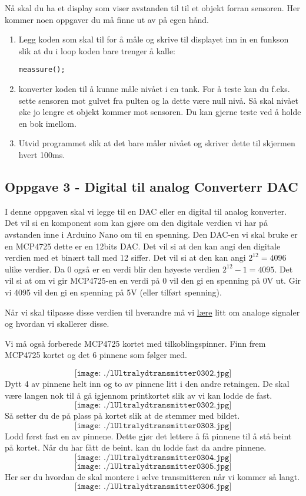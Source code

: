 \vskip 5pt 
Nå skal du ha et display som viser avstanden til til et objekt forran sensoren. Her kommer noen oppgaver du må finne ut av på egen hånd.
\begin{enumerate}
	\item Legg koden som skal til for å måle og skrive til displayet inn in en funkson slik at du i loop koden bare trenger å kalle:
		\begin{lstlisting}[language=Arduino]
		meassure();
		\end{lstlisting}
	\item konverter koden til å kunne måle nivået i en tank. For å teste kan du f.eks. sette sensoren mot gulvet fra  pulten og la dette være null nivå. Så skal nivået øke jo lengre et objekt kommer mot sensoren. Du kan gjerne teste ved å holde en bok imellom. 
	\item Utvid programmet slik at det bare måler nivået og skriver dette til skjermen hvert 100ms. 
\end{enumerate}

\newpage
\subsection*{Oppgave 3 - Digital til analog Converterr DAC}
I denne oppgaven skal vi legge til en DAC eller en digital til analog konverter. Det vil si en komponent som kan gjøre om den digitale verdien vi har på avstanden inne i Arduino Nano om til en spenning. Den DAC-en vi skal bruke er en MCP4725 dette er en 12bits DAC. Det vil si at den kan angi den digitale verdien med et binært tall med 12 siffer. 
\vskip 5pt 
Det vil si at den kan angi $2^{12}=4096$ ulike verdier. Da 0 også er en verdi blir den høyeste verdien $2^{12}-1=4095$.  Det vil si at om vi gir MCP4725-en en verdi på 0 vil den gi en spenning på 0V ut. Gir vi 4095 vil den gi en spenning på 5V (eller tilført spenning).

\vskip 5pt 

Når vi skal tilpasse disse verdien til hverandre må vi \href {https://autofaget.no/analog.html} {lære} litt om analoge signaler og hvordan vi skallerer disse. 

\vskip 5pt 
\vskip 5pt 
Vi må også forberede MCP4725 kortet med tilkoblingspinner. Finn frem MCP4725 kortet og det 6 pinnene som følger med. 


$$\texttt{[image: ./lUltralydtransmitter0302.jpg]}$$
Dytt 4 av pinnene helt inn og to av pinnene litt i den andre retningen. De skal være langen nok til å gå igjennom printkortet slik av vi kan lodde de fast. 
$$\texttt{[image: ./lUltralydtransmitter0302.jpg]}$$
Så setter du de på plass på kortet slik at de stemmer med bildet. 
$$\texttt{[image: ./lUltralydtransmitter0303.jpg]}$$
Lodd først fast en av pinnene. Dette gjør det lettere å få pinnene til å stå beint på kortet. Når du har fått de beint. kan du lodde fast da andre pinnene. 
$$\texttt{[image: ./lUltralydtransmitter0304.jpg]}$$
$$\texttt{[image: ./lUltralydtransmitter0305.jpg]}$$
Her ser du hvordan de skal montere i selve transmitteren når vi kommer så langt. 
$$\texttt{[image: ./lUltralydtransmitter0306.jpg]}$$

